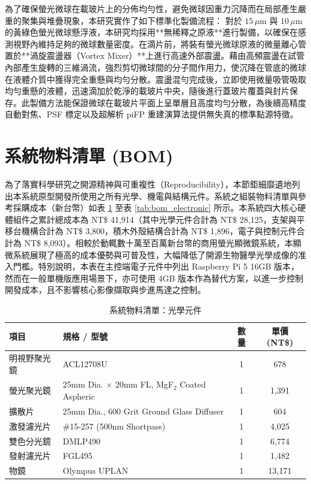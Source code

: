 為了確保螢光微球在載玻片上的分佈均勻性，避免微球因重力沉降而在局部產生嚴重的聚集與堆疊現象，本研究實作了如下標準化製備流程：
對於 $15\,\mu\text{m}$ 與 $10\,\mu\text{m}$ 的黃綠色螢光微球懸浮液，本研究均採用**無稀釋之原液**進行製備，以確保在感測視野內維持足夠的微球數量密度。在滴片前，將裝有螢光微球原液的微量離心管置於**渦旋震盪器（Vortex Mixer）**上進行高速外部震盪。藉由高頻震盪在試管內部產生旋轉的三維渦流，強烈剪切微球間的分子間作用力，使沉降在管底的微球在液體介質中獲得完全重懸與均勻分散。震盪混勻完成後，立即使用微量吸管吸取均勻重懸的液體，迅速滴加於乾淨的載玻片中央，隨後進行蓋玻片覆蓋與封片保存。此製備方法能保證微球在載玻片平面上呈單層且高度均勻分散，為後續高精度自動對焦、PSF 標定以及超解析 piFP 重建演算法提供無失真的標準點源特徵。


\section{系統物料清單 (BOM)}

為了落實科學研究之開源精神與可重複性（Reproducibility），本節鉅細靡遺地列出本系統原型開發所使用之所有光學、機電與結構元件。系統之組裝物料清單與參考採購成本（新台幣）如表 \ref{tab:bom_optics} 至表 \ref{tab:bom_electronic} 所示。本系統四大核心硬體組件之累計總成本為 NT\$ 41,914（其中光學元件合計為 NT\$ 28,125，支架與平移台機構合計為 NT\$ 3,800，積木外殼結構合計為 NT\$ 1,896，電子與控制元件合計為 NT\$ 8,093）。相較於動輒數十萬至百萬新台幣的商用螢光顯微鏡系統，本顯微系統展現了極高的成本優勢與可普及性，大幅降低了開源生物醫學光學成像的准入門檻。特別說明，本表在主控端電子元件中列出 Raspberry Pi 5 16GB 版本，然而在一般單機版應用場景下，亦可使用 4GB 版本作為替代方案，以進一步控制開發成本，且不影響核心影像擷取與步進馬達之控制。

\begin{table}[H]
    \centering
    \caption{系統物料清單：光學元件}
    \label{tab:bom_optics}
    \begin{tabular}{llcc}
        \toprule
        項目 & 規格 / 型號 & 數量 & 單價 (NT\$) \\
        \midrule
        明視野聚光鏡 & ACL12708U & 1 & 678 \\
        螢光聚光鏡 & 25mm Dia. $\times$ 20mm FL, MgF$_2$ Coated Aspheric & 1 & 1,391 \\
        擴散片 & 25mm Dia., 600 Grit Ground Glass Diffuser & 1 & 604 \\
        激發濾光片 & \#15-257 (500nm Shortpass) & 1 & 4,025 \\
        雙色分光鏡 & DMLP490 & 1 & 6,774 \\
        發射濾光片 & FGL495 & 1 & 1,482 \\
        物鏡 & Olympus UPLAN & 1 & 13,171 \\
        \bottomrule
    \end{tabular}
\end{table}

